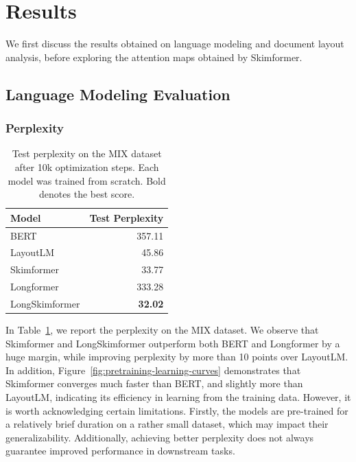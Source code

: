 \section{Results}

We first discuss the results obtained on language modeling and document layout analysis, before exploring the attention maps obtained by Skimformer.

\subsection{Language Modeling Evaluation}

\subsubsection{Perplexity}

\begin{table}
\centering \small
\begin{tabular}{lr}
    \hline
    \textbf{Model} & \textbf{Test Perplexity}\\
    \hline
    \ac{BERT} \citep{devlin2018bert} &  357.11 \\
    LayoutLM \citep{xu2020layoutlm}    & 45.86 \\
    Skimformer                         & 33.77 \\
    \midrule
    Longformer \citep{beltagy2020longformer} & 333.28 \\
    LongSkimformer                     & \textbf{32.02} \\
    \hline
\end{tabular}
\caption{Test perplexity on the MIX dataset after 10k optimization steps. Each model was trained from scratch. Bold denotes the best score.}
\label{tab:ppl-mix}
\end{table}

In Table~\ref{tab:ppl-mix}, we report the perplexity on the MIX dataset. We observe that Skimformer and LongSkimformer outperform both \ac{BERT} and Longformer by a huge margin, while improving perplexity by more than 10 points over LayoutLM. In addition, Figure~\ref{fig:pretraining-learning-curves} demonstrates that Skimformer converges much faster than \ac{BERT}, and slightly more than LayoutLM, indicating its efficiency in learning from the training data. However, it is worth acknowledging certain limitations. Firstly, the models are pre-trained for a relatively brief duration on a rather small dataset, which may impact their generalizability. Additionally, achieving better perplexity does not always guarantee improved performance in downstream tasks.

